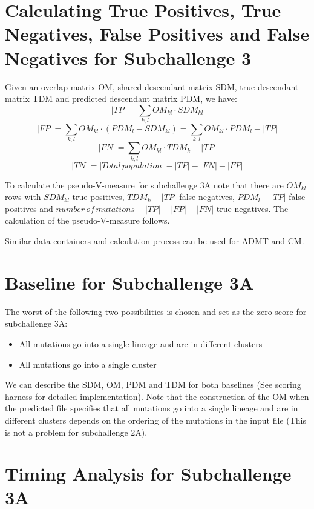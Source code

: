 \documentclass[a4paper, 11pt]{article}
\begin{document}
\section*{Calculating True Positives, True Negatives, False Positives and False Negatives for Subchallenge 3}

Given an overlap matrix OM, shared descendant matrix SDM, true descendant matrix TDM and predicted descendant matrix PDM, we have:
$$|TP| = \sum_{k,l} OM_{kl} \cdot SDM_{kl} $$ 
$$|FP| = \sum_{k,l} OM_{kl} \cdot (PDM_{l} - SDM_{kl}) = \sum_{k, l} OM_{kl} \cdot PDM_{l} - |TP|$$
$$|FN| = \sum_{k,l} OM_{kl} \cdot TDM_{k} - |TP|$$
$$|TN| = |Total\, population| - |TP| - |FN| - |FP|$$

To calculate the pseudo-V-measure for subchallenge 3A note that there are $OM_{kl}$ rows with $SDM_{kl}$ true positives, $TDM_{k} - |TP|$ false negatives, $PDM_{l} - |TP|$ false positives and $number\,of\,mutations - |TP| - |FP| -|FN|$ true negatives. The calculation of the pseudo-V-measure follows.

Similar data containers and calculation process can be used for ADMT and CM.

\section*{Baseline for Subchallenge 3A}
The worst of the following two possibilities is chosen and set as the zero score for subchallenge 3A:
\begin{itemize}
    \item All mutations go into a single lineage and are in different clusters
    \item All mutations go into a single cluster
\end{itemize} 

We can describe the SDM, OM, PDM and TDM for both baselines (See scoring harness for detailed implementation). Note that the construction of the OM when the predicted file specifies that all mutations go into a single lineage and are in different clusters depends on the ordering of the mutations in the input file (This is not a problem for subchallenge 2A).

\section*{Timing Analysis for Subchallenge 3A}
\end{document}
